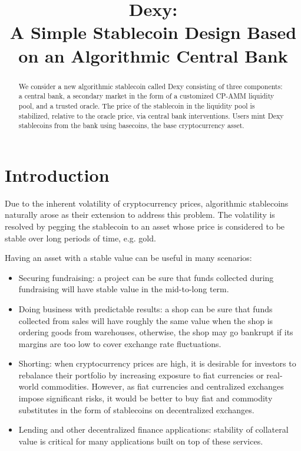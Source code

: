 \documentclass{ifcolog}
\title{Dexy:\protect \\ A Simple Stablecoin Design Based on an Algorithmic Central Bank}
\begin{document}
\maketitle

\begin{abstract}
We consider a new algorithmic stablecoin called Dexy consisting of three components: 
a central bank, a secondary market in the form of a customized CP-AMM liquidity pool, and a trusted oracle. 
The price of the stablecoin in the liquidity pool is stabilized, relative to the oracle price, via central bank interventions. 
Users mint Dexy stablecoins from the bank using basecoins, the base cryptocurrency asset.
\end{abstract}

\section{Introduction}
\label{sec:introduction}
Due to the inherent volatility of cryptocurrency prices, algorithmic stablecoins naturally arose as their extension 
to address this problem. The volatility is resolved by pegging the stablecoin to an asset whose price is 
considered to be stable over long periods of time, e.g. gold. 

Having an asset with a stable value can be useful in many scenarios:
\begin{itemize}
\item Securing fundraising: a project can be sure that funds collected during fundraising will have stable value in the mid-to-long term.
\item Doing business with predictable results: a shop can be sure that funds collected from sales will have roughly the same value when the shop is ordering goods from warehouses, otherwise, the shop may go bankrupt if its margins are too low to cover exchange rate fluctuations. 
\item Shorting: when cryptocurrency prices are high, it is desirable for investors to rebalance their portfolio by increasing exposure to fiat currencies or real-world commodities. However, as fiat currencies and centralized exchanges impose significant risks, it would be better to buy fiat and commodity substitutes in the form of stablecoins on decentralized exchanges.
\item Lending and other decentralized finance applications: stability of collateral value is critical for many applications built on top of these services.
\end{itemize}
\end{document}

